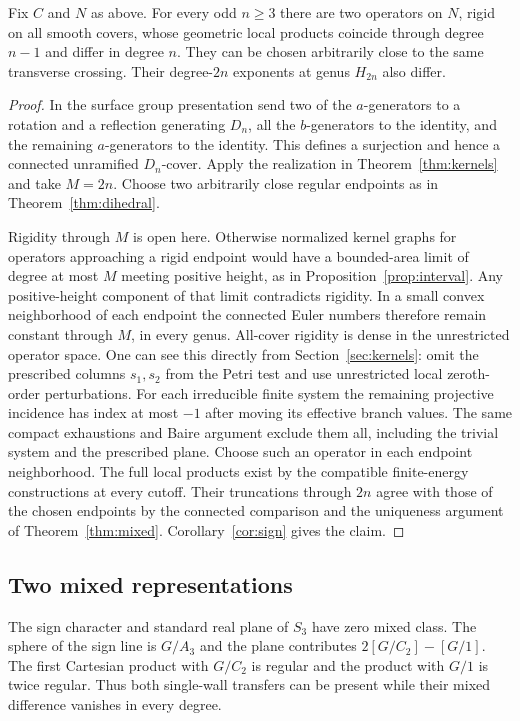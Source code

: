 \begin{corollary}\label{cor:separation}
Fix $C$ and $N$ as above. For every odd $n\ge3$ there are two
operators on $N$, rigid on all smooth covers, whose geometric local
products coincide through degree $n-1$ and differ in degree $n$.
They can be chosen arbitrarily close to the same transverse crossing.
Their degree-$2n$ exponents at genus $H_{2n}$ also differ.
\end{corollary}

\begin{proof}
In the surface group presentation send two of the $a$-generators
to a rotation and a reflection generating $D_n$, all the
$b$-generators to the identity, and the remaining $a$-generators
to the identity. This defines a surjection and hence a connected
unramified $D_n$-cover. Apply the realization in
Theorem~\ref{thm:kernels} and take $M=2n$. Choose two arbitrarily
close regular endpoints as in Theorem~\ref{thm:dihedral}.

Rigidity through $M$ is open here. Otherwise normalized kernel
graphs for operators approaching a rigid endpoint would have a
bounded-area limit of degree at most $M$ meeting positive height,
as in Proposition~\ref{prop:interval}. Any positive-height
component of that limit contradicts rigidity. In a small convex
neighborhood of each endpoint the connected Euler numbers therefore
remain constant through $M$, in every genus. All-cover rigidity is
dense in the unrestricted operator space. One can see this directly
from Section~\ref{sec:kernels}: omit the prescribed columns $s_1,s_2$
from the Petri test and use unrestricted local zeroth-order
perturbations. For each irreducible finite system the remaining
projective incidence has index at most $-1$ after moving its effective
branch values. The same compact exhaustions and Baire argument exclude
them all, including the trivial system and the prescribed plane.
Choose such an operator in each endpoint neighborhood. The full local
products exist by the compatible finite-energy constructions at every
cutoff. Their truncations through $2n$ agree with those of the chosen
endpoints by the connected comparison and the uniqueness argument of
Theorem~\ref{thm:mixed}. Corollary~\ref{cor:sign} gives the claim.
\end{proof}

\subsection{Two mixed representations}
The sign character and standard real plane of \(S_3\) have zero mixed class. The sphere of the sign line is \(G/A_3\) and the plane contributes \(2[G/C_2]-[G/1]\). The first Cartesian product with \(G/C_2\) is regular and the product with \(G/1\) is twice regular. Thus both single-wall transfers can be present while their mixed difference vanishes in every degree.

